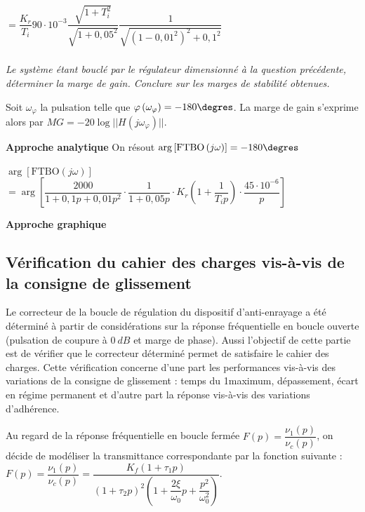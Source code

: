 \documentclass[10pt,fleqn]{article} %
\begin{document}
\begin{multicols}{2}
\begin{corrige}
$ =  \dfrac{K_r}{T_i}  90\cdot 10^{-3}  
\dfrac{\sqrt{1+T_i^2}}{\sqrt{1+0,05^2 }}
\dfrac{1}{\sqrt{\left(1-0,01^2\right)^2+0,1^2}} $

\end{corrige}
\else
\fi


\subparagraph{}\textit{Le système étant bouclé par le régulateur dimensionné à la question
précédente, déterminer la marge de gain. Conclure sur les marges de stabilité obtenues.}
\begin{methode}
Soit $\omega_{\varphi}$ la pulsation telle que $\varphi\left(\omega_{\varphi} \right)=-180\degres$. La marge de gain s'exprime alors par $MG=-20\log||H\left(j \omega_{\varphi} \right)||$.
\end{methode}


\begin{corrige}
\textbf{Approche analytique}
On résout $\arg \left[\text{FTBO}\left( j \omega\right)\right] = -180 \degres$ 


$\arg \left[\text{FTBO}\left( j \omega\right)\right]$ 
$ = \arg \left[
\dfrac{2000}{1+0,1p+0,01p^2}
\cdot
\dfrac{1}{1+0,05p}
\cdot 
K_r
 \left(1+\dfrac{1}{T_i p} \right) \cdot 
\dfrac{45\cdot 10^{-6}}{p}
\right] $


\textbf{Approche graphique}

\end{corrige}
\else
\fi

\subsection*{Vérification du cahier des charges vis-à-vis de la consigne de glissement}
Le correcteur de la boucle de régulation du dispositif d’anti-enrayage a été déterminé
à partir de considérations sur la réponse fréquentielle en boucle ouverte
(pulsation de coupure à $\SI{0}{dB}$ et marge de phase). Aussi l’objectif de cette partie
est de vérifier que le correcteur déterminé permet de satisfaire le cahier des charges.
Cette vérification concerne d’une part les performances vis-à-vis des variations
de la consigne de glissement : temps du 1\ier maximum, dépassement, écart
en régime permanent et d’autre part la réponse vis-à-vis des variations d’adhérence.

Au regard de la réponse fréquentielle en boucle fermée $F(p)=\dfrac{\nu_1(p)}{\nu_c(p)}$, on
décide de modéliser la transmittance correspondante par la fonction suivante :
$ F(p)=\dfrac{\nu_1(p)}{\nu_c(p)}=\dfrac{K_f\left( 1+\tau_1 p\right)}{\left( 1+\tau_2 p\right)^2 \left({1+\dfrac{2 \xi }{\omega_0}p+\dfrac{p^2}{\omega_0^2}} \right)} $.


\end{multicols}
\end{document}

